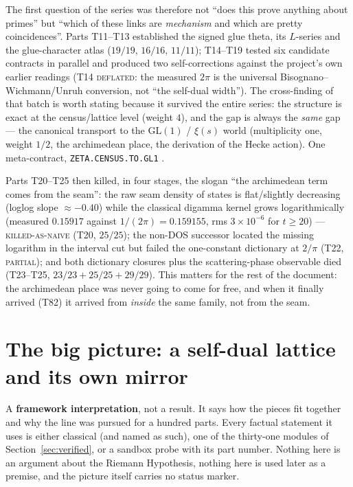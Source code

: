 \documentclass[11pt,a4paper]{article}
\begin{document}
\noindent The first question of the series was therefore not ``does this prove anything about
primes'' but ``which of these links are \emph{mechanism} and which are pretty coincidences''. Parts
T11--T13 established the signed glue theta, its $L$-series and the glue-character atlas
($19/19$, $16/16$, $11/11$); T14--T19 tested six candidate contracts in parallel and produced two
self-corrections against the project's own earlier readings (T14 \textsc{deflated}: the measured
$2\pi$ is the universal Bisognano--Wichmann/Unruh conversion, not ``the self-dual width''). The
cross-finding of that batch is worth stating because it survived the entire series: the structure is
exact at the census/lattice level (weight $4$), and the gap is always the \emph{same} gap --- the
canonical transport to the $\mathrm{GL}(1)$ / $\xi(s)$ world (multiplicity one, weight $1/2$, the
archimedean place, the derivation of the Hecke action). One meta-contract, \texttt{ZETA.CENSUS.TO.GL1}
\mO.

Parts T20--T25 then killed, in four stages, the slogan ``the archimedean term comes from the seam'':
the raw seam density of states is flat/slightly decreasing (loglog slope $\approx-0.40$) while the
classical digamma kernel grows logarithmically (measured $0.15917$ against $1/(2\pi)=0.159155$, rms
$3\times10^{-6}$ for $t\ge20$) --- \textsc{killed-as-naive} (T20, $25/25$); the non-DOS successor
located the missing logarithm in the interval cut but failed the one-constant dictionary at $2/\pi$
(T22, \textsc{partial}); and both dictionary closures plus the scattering-phase observable died
(T23--T25, $23/23+25/25+29/29$). This matters for the rest of the document: the archimedean place was
never going to come for free, and when it finally arrived (T82) it arrived from \emph{inside} the same
family, not from the seam.

\section{The big picture: a self-dual lattice and its own mirror}\label{sec:bigpicture}
\begin{gapboxnb}
A \textbf{framework interpretation}, not a result. It says how the pieces fit together and why the line
was pursued for a hundred parts. Every factual statement it uses is either classical (and named as
such), one of the thirty-one modules of Section~\ref{sec:verified}, or a sandbox probe with its part number.
Nothing here is an argument about the Riemann Hypothesis, nothing here is used later as a premise, and
the picture itself carries no status marker.
\end{gapboxnb}
\end{document}
